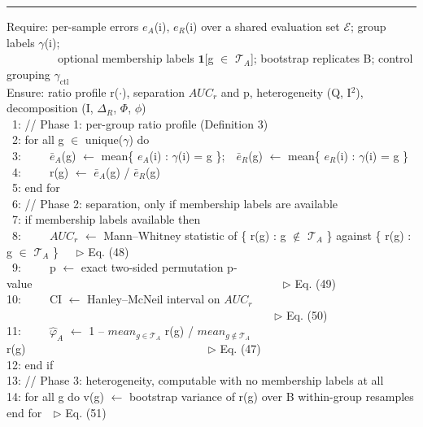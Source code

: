 \begin{algorithm}[htbp]
\caption{GERA: Group Error-Ratio Audit for asymmetric exposure}
\label{alg:2}
\hrule\vspace{3pt}
{\ttfamily\scriptsize\raggedright
Require: per-sample errors $e_{A}$(i), $e_{R}$(i) over a shared evaluation set $\mathcal{E}$; group labels $\gamma$(i); \\
~~~~~~~~~optional membership labels $\mathbf{1}$[g $\in$ $\mathcal{T}_{A}$]; bootstrap replicates B; control grouping $\gamma_{\mathrm{ctl}}$ \\
Ensure: ratio profile r($\cdot$), separation $AUC_{r}$ and p, heterogeneity (Q, I$^{2}$), decomposition ($\mathrm{I}$, $\Delta_{R}$, $\Phi$, $\phi$) \\
~1: // Phase 1: per-group ratio profile (Definition 3) \\
~2: for all g $\in$ unique($\gamma$) do \\
~3:~~~~~$\bar{e}_{A}$(g) $\leftarrow$ mean\{ $e_{A}$(i) : $\gamma$(i) = g \};~~$\bar{e}_{R}$(g) $\leftarrow$ mean\{ $e_{R}$(i) : $\gamma$(i) = g \} \\
~4:~~~~~r(g) $\leftarrow$ $\bar{e}_{A}$(g) / $\bar{e}_{R}$(g) \\
~5: end for \\
~6: // Phase 2: separation, only if membership labels are available \\
~7: if membership labels available then \\
~8:~~~~~$AUC_{r}$ $\leftarrow$ Mann--Whitney statistic of \{ r(g) : g $\notin$ $\mathcal{T}_{A}$ \} against \{ r(g) : g $\in$ $\mathcal{T}_{A}$ \}~~~$\triangleright$ Eq. (48) \\
~9:~~~~~p $\leftarrow$ exact two-sided permutation p-value~~~~~~~~~~~~~~~~~~~~~~~~~~~~~~~~~~~~~~~~~~~~$\triangleright$ Eq. (49) \\
10:~~~~~CI $\leftarrow$ Hanley--McNeil interval on $AUC_{r}$~~~~~~~~~~~~~~~~~~~~~~~~~~~~~~~~~~~~~~~~~~~~~~~$\triangleright$ Eq. (50) \\
11:~~~~~$\hat{\varphi }_{A}$ $\leftarrow$ 1 -- $mean_{g \in \mathcal{T}_{A}}$ r(g) / $mean_{g \notin \mathcal{T}_{A}}$ r(g)~~~~~~~~~~~~~~~~~~~~~~~~~~~~~~~~$\triangleright$ Eq. (47) \\
12: end if \\
13: // Phase 3: heterogeneity, computable with no membership labels at all \\
14: for all g do v(g) $\leftarrow$ bootstrap variance of r(g) over B within-group resamples end for~~$\triangleright$ Eq. (51) \\
}
\end{algorithm}

